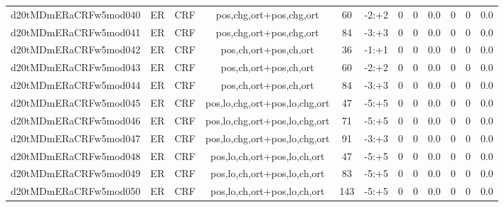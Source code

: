 \documentclass[a4paper]{article}
\begin{document}
\begin{landscape}
\begin{center}
\begin{tabular}{ |c|c|c|c|c|c|c|c|c|c|c|c|}
 
 	
 	\small{ d20tMDmERaCRFw5mod040 } & ER & CRF & pos,chg,ort+pos,chg,ort  &  60 &  -2:+2  &  0 & 0 & 0.0  &  0 & 0 & 0.0 \\
 	

 
 	
 	\small{ d20tMDmERaCRFw5mod041 } & ER & CRF & pos,chg,ort+pos,chg,ort  &  84 &  -3:+3  &  0 & 0 & 0.0  &  0 & 0 & 0.0 \\
 	

 
 	
 	\small{ d20tMDmERaCRFw5mod042 } & ER & CRF & pos,ch,ort+pos,ch,ort  &  36 &  -1:+1  &  0 & 0 & 0.0  &  0 & 0 & 0.0 \\
 	

 
 	
 	\small{ d20tMDmERaCRFw5mod043 } & ER & CRF & pos,ch,ort+pos,ch,ort  &  60 &  -2:+2  &  0 & 0 & 0.0  &  0 & 0 & 0.0 \\
 	

 
 	
 	\small{ d20tMDmERaCRFw5mod044 } & ER & CRF & pos,ch,ort+pos,ch,ort  &  84 &  -3:+3  &  0 & 0 & 0.0  &  0 & 0 & 0.0 \\
 	

 
 	
 	\small{ d20tMDmERaCRFw5mod045 } & ER & CRF & pos,lo,chg,ort+pos,lo,chg,ort  &  47 &  -5:+5  &  0 & 0 & 0.0  &  0 & 0 & 0.0 \\
 	

 
 	
 	\small{ d20tMDmERaCRFw5mod046 } & ER & CRF & pos,lo,chg,ort+pos,lo,chg,ort  &  71 &  -5:+5  &  0 & 0 & 0.0  &  0 & 0 & 0.0 \\
 	

 
 	
 	\small{ d20tMDmERaCRFw5mod047 } & ER & CRF & pos,lo,chg,ort+pos,lo,chg,ort  &  91 &  -3:+3  &  0 & 0 & 0.0  &  0 & 0 & 0.0 \\
 	

 
 	
 	\small{ d20tMDmERaCRFw5mod048 } & ER & CRF & pos,lo,ch,ort+pos,lo,ch,ort  &  47 &  -5:+5  &  0 & 0 & 0.0  &  0 & 0 & 0.0 \\
 	

 
 	
 	\small{ d20tMDmERaCRFw5mod049 } & ER & CRF & pos,lo,ch,ort+pos,lo,ch,ort  &  83 &  -5:+5  &  0 & 0 & 0.0  &  0 & 0 & 0.0 \\
 	

 
 	
 	\small{ d20tMDmERaCRFw5mod050 } & ER & CRF & pos,lo,ch,ort+pos,lo,ch,ort  &  143 &  -5:+5  &  0 & 0 & 0.0  &  0 & 0 & 0.0 \\
 	


\end{tabular}
\end{center}
\end{landscape}
\end{document}
